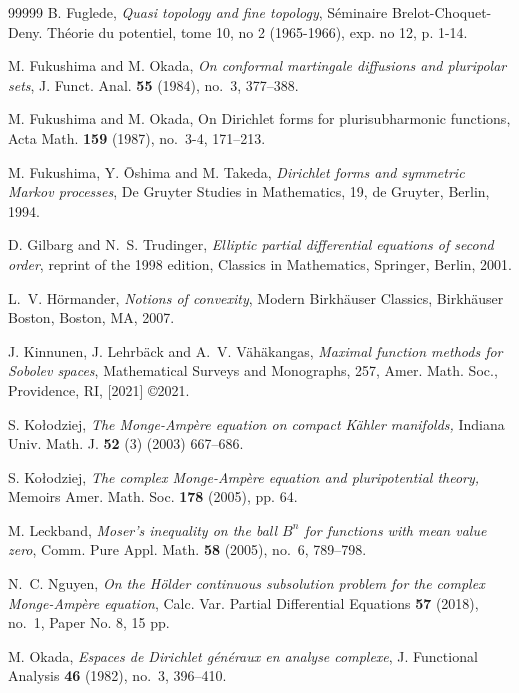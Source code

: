 \documentclass{amsart}
\theoremstyle{definition}
\numberwithin{thm}{section}
\numberwithin{equation}{section}
\renewcommand{\[}{\begin{equation}}
\renewcommand{\]}{\end{equation}}
\begin{document}
\begin{thebibliography}{99999}
 B. Fuglede, {\it Quasi topology and fine topology}, Séminaire Brelot-Choquet-Deny. Th\'eorie du potentiel, tome 10, no 2 (1965-1966), exp. no 12, p. 1-14.

M. Fukushima and M. Okada, {\it On conformal martingale diffusions and pluripolar sets}, J. Funct. Anal. {\bf 55} (1984), no.~3, 377--388.

M. Fukushima and M. Okada, On Dirichlet forms for plurisubharmonic functions, Acta Math. {\bf 159} (1987), no.~3-4, 171--213.

M. Fukushima, Y. \=Oshima and M. Takeda, {\it Dirichlet forms and symmetric Markov processes}, De Gruyter Studies in Mathematics, 19, de Gruyter, Berlin, 1994.

  D. Gilbarg and N.~S. Trudinger, {\it Elliptic partial differential equations of second order}, reprint of the 1998 edition,  Classics in Mathematics, Springer, Berlin, 2001.


L.~V. H\"ormander, {\it Notions of convexity}, 
Modern Birkh\"auser Classics, Birkh\"auser Boston, Boston, MA, 2007.

J. Kinnunen, J. Lehrb\"ack and A.~V. V\"ah\"akangas, {\it Maximal function methods for Sobolev spaces}, Mathematical Surveys and Monographs, 257, Amer. Math. Soc., Providence, RI, [2021] \copyright 2021.


 S. Ko\l odziej, {\it The Monge-Amp\`ere equation on compact K\"ahler manifolds,} Indiana Univ. Math. J. {\bf 52} (3) (2003) 667--686.

 S. Ko\l odziej,  {\it The complex Monge-Amp\`ere equation and pluripotential theory,} Memoirs Amer. Math. Soc. {\bf 178} (2005), pp. 64.

M. Leckband, {\it Moser's inequality on the ball $B^n$ for functions with mean value zero}, Comm. Pure Appl. Math. {\bf 58} (2005), no.~6, 789--798.

N.~C. Nguyen, {\it On the H\"older continuous subsolution problem for the complex Monge-Amp\`ere equation}, Calc. Var. Partial Differential Equations {\bf 57} (2018), no.~1, Paper No. 8, 15 pp.



M. Okada, {\it Espaces de Dirichlet g\'en\'eraux en analyse complexe}, J. Functional Analysis {\bf 46} (1982), no.~3, 396--410.


\end{thebibliography}
\end{document}
